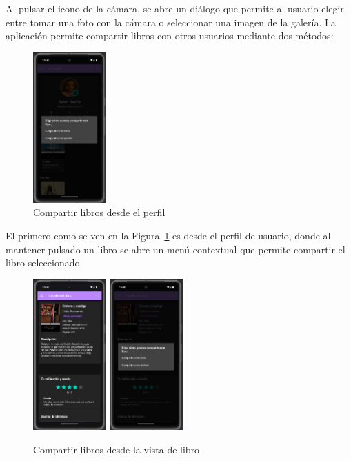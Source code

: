 \documentclass[a4paper,11pt]{report}
\begin{document}
      Al pulsar el icono de la cámara, se abre un diálogo que permite al usuario elegir entre tomar una foto con la cámara o seleccionar una imagen de la galería.
      La aplicación permite compartir libros con otros usuarios mediante dos métodos:
      \begin{figure}[H]
        \centering
        \includegraphics[width=0.25\textwidth]{.img/compartir_perfil.png}
        \caption{Compartir libros desde el perfil}
        \label{fig:compartir-perfil}
      \end{figure}
      El primero como se ven en la Figura~\ref{fig:compartir-perfil} es desde el perfil de usuario, donde al mantener pulsado un libro se abre un menú contextual que permite compartir el libro seleccionado.
      \begin{figure}[H]
        \centering
        \includegraphics[width=0.25\textwidth]{.img/compartir_libro_1.png}
        \hspace{2cm}
        \includegraphics[width=0.25\textwidth]{.img/compartir_libro_2.png}
        \caption{Compartir libros desde la vista de libro}
        \label{fig:compartir-libro}
      \end{figure}
\end{document}

